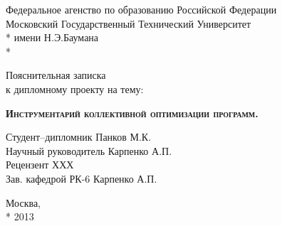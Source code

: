 \begin{titlepage}
    \newpage
    
    \begin{center}
        Федеральное агенство по образованию Российской Федерации \\
        Московский Государственный Технический Университет \\*
        имени Н.Э.Баумана \\*
        \vspace{-12mm}
        \begin{figure}[h]
        \end{figure}
        \vspace{-16mm}
        \hrulefill
    \end{center}
    \begin{center}
        \Large Пояснительная записка \\ к дипломному проекту на тему:
    \end{center}
    
    \vspace{2.5em}
    
    \begin{center}
        \textsc{\textbf{Инструментарий коллективной оптимизации программ.}}
    \end{center}
    
    \vspace{6em}
    
    \begin{flushleft}
        \hspace{6.5cm}Студент--дипломник \hrulefill Панков М.К. \\
        \vspace{1.5em}
        \hspace{6.5cm}Научный руководитель \hrulefill Карпенко А.П.\\
        \vspace{1.5em}
        \hspace{6.5cm}Рецензент \hrulefill ХХХ\\
        \vspace{1.5em}
        \hspace{6.5cm}Зав. кафедрой РК-6 \hrulefill Карпенко А.П.
    \end{flushleft}
    
    \vspace{\fill}
    
    \begin{center}
        Москва, \\*
        2013
    \end{center}

\end{titlepage}